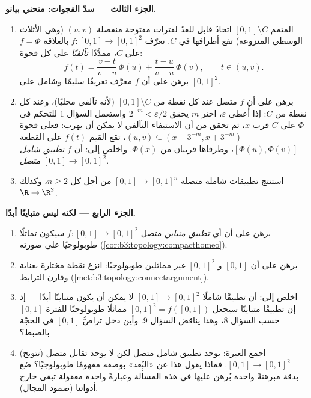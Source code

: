 \begin{problem}
\medskip
\noindent\textbf{الجزء الثالث --- سدّ الفجوات: منحني بيانو.}
\begin{enumerate}[resume]
  \item المتمم $[0,1] \setminus C$ اتحادٌ قابل للعدّ لفترات مفتوحة منفصلة
        $(u, v)$ (وهي الأثلاث الوسطى المنزوعة) تقع أطرافها في
        $C$. نعرّف $f \colon
        [0,1] \to [0,1]^2$ بالعلاقة $f = \Phi$ على $C$، ممدَّدًا
        \emph{تآلفيًا} على كل فجوة:
        \[
        f(t) = \frac{v - t}{v - u}\,\Phi(u) +
        \frac{t - u}{v - u}\,\Phi(v),
        \qquad t \in (u, v).
        \]
        برهن على أن $f$ معرَّف تعريفًا سليمًا وشامل على
        $[0,1]^2$.
  \item برهن على أن $f$ متصل عند كل نقطة من $[0,1]
        \setminus C$ (لأنه تآلفي
        محليًا)، وعند كل نقطة من $C$: إذا أُعطي $\varepsilon$،
        اختر $m$ يحقق $2^{-m} <
        \varepsilon/2$ واستعمل السؤال 1 للتحكم في $\Phi$
        على $C$ قرب $x$، ثم تحقق من أن الاستيفاء التآلفي لا يمكن
        أن يهرب: فعلى فجوة $(u,v) \subseteq
        (x - 3^{-m}, x + 3^{-m})$، تقع القيم $f(t)$ على القطعة
        $[\Phi(u), \Phi(v)]$، وطرفاها قريبان من $\Phi(x)$. واخلص إلى: أن $f$
        \emph{تطبيق شامل متصل} $[0,1] \to [0,1]^2$.
  \item استنتج تطبيقات شاملة متصلة $[0,1] \to [0,1]^n$ من أجل كل $n \geq 2$،
        وكذلك $\R \to \R^2$.
\end{enumerate}

\medskip
\noindent\textbf{الجزء الرابع --- لكنه ليس متباينًا أبدًا.}
\begin{enumerate}[resume]
  \item برهن على أن أي \emph{تطبيق متباين} متصل $f \colon [0,1]
        \to [0,1]^2$ سيكون
        تماثلًا طوبولوجيًا على صورته (\cref{cor:b3:topology:compacthomeo}).
  \item برهن على أن $[0,1]$ و $[0,1]^2$ غير مماثلين طوبولوجيًا:
        انزع نقطة مختارة بعناية وقارن الترابط (\cref{met:b3:topology:connectargument}).
  \item اخلص إلى: أن تطبيقًا شاملًا  $[0,1] \to [0,1]^2$ لا يمكن أن
        يكون متباينًا أبدًا --- إذ إن تطبيقًا متباينًا سيجعل
        $[0,1]^2 = f([0,1])$ مماثلًا طوبولوجيًا للفترة $[0,1]$ حسب السؤال 8، وهذا
        يناقض السؤال 9. وأين دخل تراصُّ $[0,1]$ في الحجّة
        بالضبط؟
  \item (تتويج) اجمع العبرة: يوجد تطبيق شامل متصل لكن لا يوجد
        تقابل متصل $[0,1] \to
        [0,1]^2$. فماذا يقول هذا عن «البُعد» بوصفه
        مفهومًا طوبولوجيًا؟ صُغ بدقة مبرهنةً واحدة بُرهن عليها
        في هذه المسألة وعبارةً واحدة معقولة تبقى خارج أدواتنا
        (صمود المجال).
\end{enumerate}


\end{problem}
